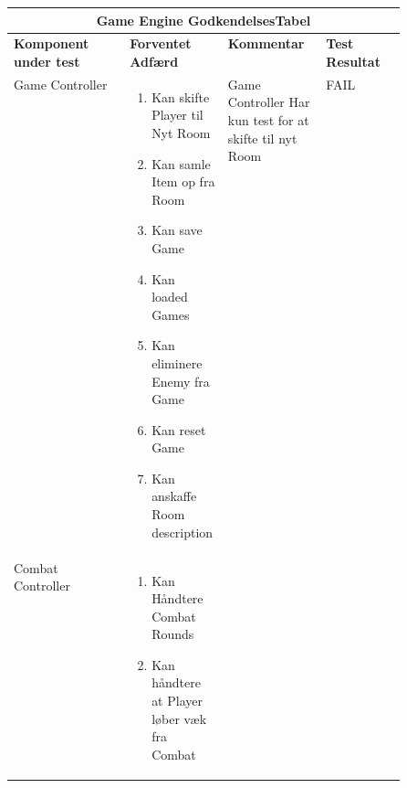 \begin{center}
\begin{longtable}{|l|p{0.25\linewidth}|p{0.25\linewidth}|l|}
  \hline
  \multicolumn{4}{|c|}{\textbf{Game Engine GodkendelsesTabel}} \\ \hline
  \textbf{Komponent under test} & \textbf{Forventet Adfærd} & \textbf{Kommentar} & \textbf{Test Resultat} \\ \hline
  Game Controller
  &
    \begin{enumerate}
      \item \begin{flushleft} Kan skifte Player til Nyt Room \end{flushleft}
      \item \begin{flushleft} Kan samle Item op fra Room  \end{flushleft}
      \item \begin{flushleft} Kan save Game \end{flushleft}
      \item \begin{flushleft} Kan loaded Games \end{flushleft}
      \item \begin{flushleft} Kan eliminere Enemy fra Game \end{flushleft}
      \item \begin{flushleft} Kan reset Game \end{flushleft}
      \item \begin{flushleft} Kan anskaffe Room description \end{flushleft}
    \end{enumerate}
  &
  \flushleft 
  Game Controller Har kun test for at skifte til nyt Room
  &
  FAIL
  \\ \hline
  Combat Controller
  &
  \begin{enumerate}
    \item \begin{flushleft} Kan Håndtere Combat Rounds \end{flushleft}
    \item \begin{flushleft} Kan håndtere at Player løber væk fra Combat \end{flushleft}
  \end{enumerate}
  &
  \flushleft

\end{longtable}
\end{center}
